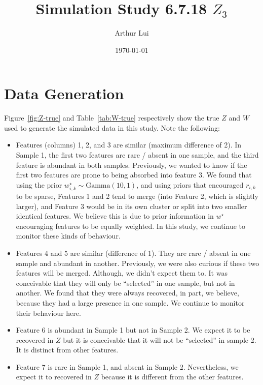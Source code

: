 \documentclass[10pt]{article} %
\title{Simulation Study 6.7.18 $Z_3$}
\author{Arthur Lui}
\date{\today} %
\newcommand{\Gam}{ \text{Gamma} }
\begin{document}
\maketitle



\section{Data Generation}\label{sec:data-generation}
Figure~\ref{fig:Z-true} and Table~\ref{tab:W-true} respectively show the true
$Z$ and $W$ used to generate the simulated data in this study. Note the following:
\begin{itemize}
  \item Features (columns) 1, 2, and 3 are similar (maximum difference of 2).
    In Sample 1, the first two features are rare / absent in one sample, and
    the third feature is abundant in both samples. Previously, we wanted to
    know if the first two features are prone to being absorbed into feature 3. We
    found that using the prior $w^\star_{i,k} \sim \Gam(10, 1)$, and using priors
    that encouraged $r_{i,k}$ to be sparse, Features 1 and 2 tend to merge
    (into Feature 2, which is slightly larger), and Feature 3 would be in its
    own cluster or split into two smaller identical features. We believe this is 
    due to prior information in $w^\star$ encouraging features to be equally weighted.
    In this study, we continue to monitor these kinds of behaviour.
  \item Features 4 and 5 are similar (difference of 1). They are rare / absent
    in one sample and abundant in another. Previously, we were also curious if
    these two features will be merged. Although, we didn't expect them to. It was
    conceivable that they will only be ``selected'' in one sample, but not in
    another. We found that they were always recovered, in part, we believe, because
    they had a large presence in one sample. We continue to monitor their behaviour
    here.
  \item Feature 6 is abundant in Sample 1 but not in Sample 2. We expect it to be
    recovered in $Z$ but it is conceivable that it will not be ``selected'' in sample
    2. It is distinct from other features.
  \item Feature 7 is rare in Sample 1, and absent in Sample 2. Nevertheless, we
    expect it to recovered in $Z$ because it is different from the other
    features.
\end{itemize}
\end{document}
